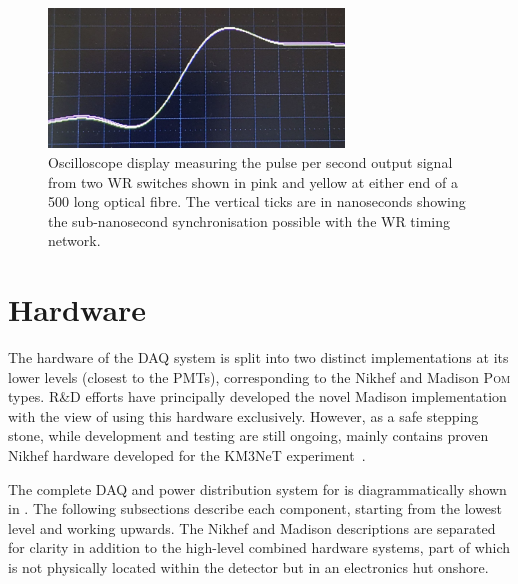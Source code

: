 \begin{figure} %
    \includegraphics[width=0.7\textwidth]{diagrams/5-daq/sync.pdf}
    \caption[Picture of White Rabbit timing synchronisation seen within \chipsfive]
    {Oscilloscope display measuring the pulse per second output signal from two WR switches shown
        in pink and yellow at either end of a \SI{500}{} long optical fibre. The vertical
        ticks are in nanoseconds showing the sub-nanosecond synchronisation possible with the WR
        timing network.}
    \label{fig:sync}
\end{figure}

\section{Hardware} %
\label{sec:daq_hard} %

The hardware of the \chipsfive DAQ system is split into two distinct implementations at its lower
levels (closest to the PMTs), corresponding to the Nikhef and Madison \textsc{Pom} types. \chips
R\&D efforts have principally developed the novel Madison implementation with the view of using
this hardware exclusively. However, as a safe stepping stone, while development and testing are
still ongoing, \chipsfive mainly contains proven Nikhef hardware developed for the KM3NeT
experiment~\cite{adrian2016}.

The complete DAQ and power distribution system for \chipsfive is diagrammatically shown in
. The following subsections describe each component, starting from the lowest
level and working upwards. The Nikhef and Madison descriptions are separated for clarity in
addition to the high-level combined hardware systems, part of which is not physically located
within the detector but in an electronics hut onshore.

